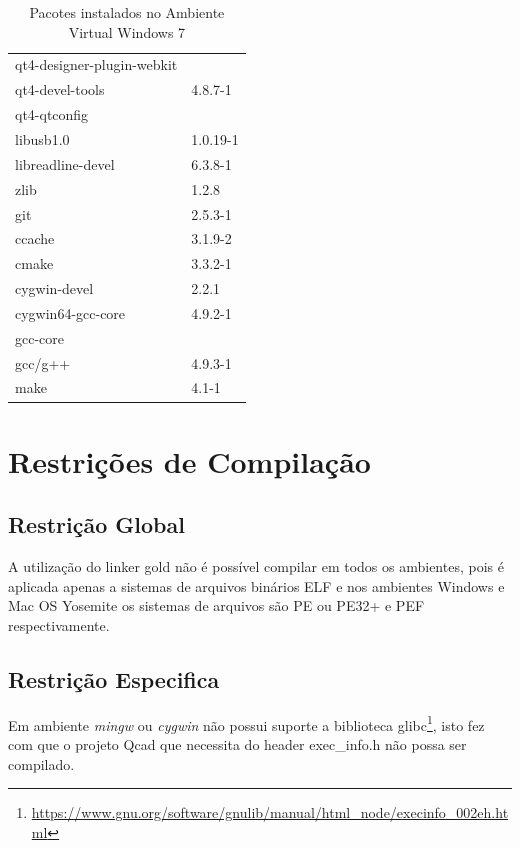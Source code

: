 \begin{itemize}
\begin{table}[h]
\begin{tabular}{ll}
qt4-designer-plugin-webkit  & \\
qt4-devel-tools & 4.8.7-1 \\ 
qt4-qtconfig & \\ \midrule

libusb1.0 & 1.0.19-1 \\ \midrule


libreadline-devel & 6.3.8-1 \\ \midrule

zlib & 1.2.8 \\ \midrule
git & 2.5.3-1 \\ \midrule
ccache & 3.1.9-2 \\ \midrule
cmake & 3.3.2-1 \\ \midrule
cygwin-devel & 2.2.1 \\ \midrule
cygwin64-gcc-core & 4.9.2-1 \\ \midrule
gcc-core & \\ \midrule
gcc/g++ & 4.9.3-1 \\ 
make & 4.1-1 \\ \bottomrule
\end{tabular} 
\caption{Pacotes instalados no Ambiente Virtual Windows 7}
\label{pacotes_instalados_windows}
\end{table}

\end{itemize}



\section{Restrições de Compilação}

\subsection{Restrição Global}
    A utilização do linker gold não é possível compilar em todos os ambientes,
 pois é aplicada apenas a sistemas de arquivos binários ELF e nos ambientes
 Windows e Mac OS Yosemite os sistemas de arquivos são PE ou PE32+ e PEF 
respectivamente.

\subsection{Restrição Especifica}
    Em ambiente \textit{mingw} ou \textit{cygwin} não possui suporte
 a biblioteca glibc\footnote{
\url{https://www.gnu.org/software/gnulib/manual/html\_node/execinfo\_002eh.html}},
 isto fez com que o projeto Qcad que necessita do header exec\_info.h não possa ser compilado.

